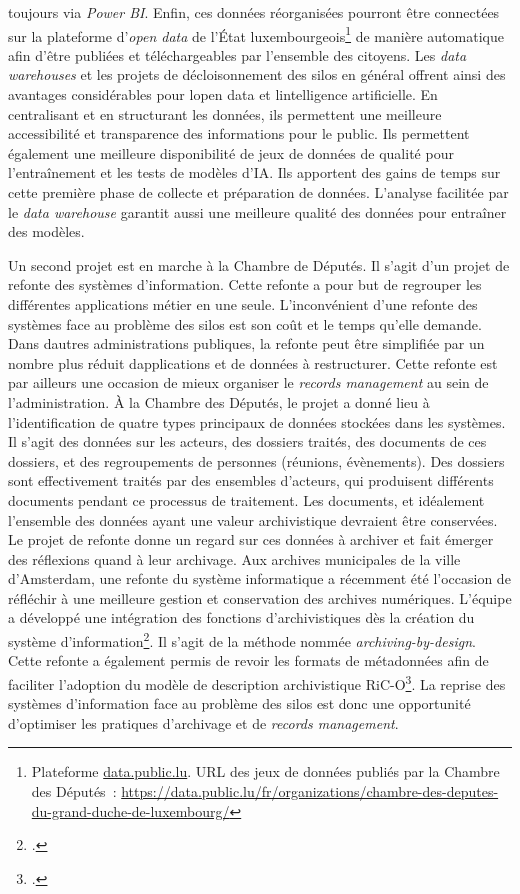 toujours via \emph{Power BI}. Enfin, ces données réorganisées pourront
être connectées sur la plateforme d'\emph{open data} de l'État
luxembourgeois\footnote{Plateforme \url{data.public.lu}. URL des jeux de
	données publiés par la Chambre des Députés~:
	\url{https://data.public.lu/fr/organizations/chambre-des-deputes-du-grand-duche-de-luxembourg/}}
de manière automatique afin d'être publiées et téléchargeables par
l'ensemble des citoyens. Les \emph{data warehouses} et les projets de
décloisonnement des silos en général offrent ainsi des avantages
considérables pour l\textquotesingle open data et
l\textquotesingle intelligence artificielle. En centralisant et en
structurant les données, ils permettent une meilleure accessibilité et
transparence des informations pour le public. Ils permettent également
une meilleure disponibilité de jeux de données de qualité pour
l'entraînement et les tests de modèles d'IA. Ils apportent des gains de
temps sur cette première phase de collecte et préparation de données.
L'analyse facilitée par le \emph{data warehouse} garantit aussi une
meilleure qualité des données pour entraîner des modèles.

Un second projet est en marche à la Chambre de Députés. Il s'agit d'un
projet de refonte des systèmes d'information. Cette refonte a
pour but de regrouper les différentes applications métier en une seule.
L'inconvénient d'une refonte des systèmes face au problème des silos
est son coût et le temps qu'elle demande. Dans d\textquotesingle autres
administrations publiques, la refonte peut être simplifiée par un nombre
plus réduit d\textquotesingle applications et de données à restructurer.
Cette refonte est par ailleurs une occasion de mieux organiser le
\emph{records management} au sein de l'administration. À la Chambre des
Députés, le projet a donné lieu à l'identification de quatre types
principaux de données stockées dans les systèmes. Il s'agit des données
sur les acteurs, des dossiers traités, des documents de ces dossiers, et
des regroupements de personnes (réunions, évènements). Des dossiers sont effectivement traités
par des ensembles d'acteurs, qui produisent différents documents pendant
ce processus de traitement. Les documents, et idéalement l'ensemble des
données ayant une valeur archivistique devraient être conservées. Le
projet de refonte donne un regard sur ces données à archiver et fait
émerger des réflexions quand à leur archivage. Aux archives municipales
de la ville d'Amsterdam, une refonte du système informatique a
récemment été l'occasion de réfléchir à une meilleure gestion et
conservation des archives numériques. L'équipe a développé une
intégration des fonctions d'archivistiques dès la création du système
d'information\footcite{cristia_information_2020}.
Il s'agit de la méthode nommée \emph{archiving-by-design}. Cette
refonte a également permis de revoir les formats de métadonnées afin
de faciliter l'adoption du modèle de description archivistique
RiC-O\footcite{noauthor_ric_nodate}. La reprise des systèmes
d'information face au problème des silos est donc une opportunité
d'optimiser les pratiques d'archivage et de \emph{records management}.

